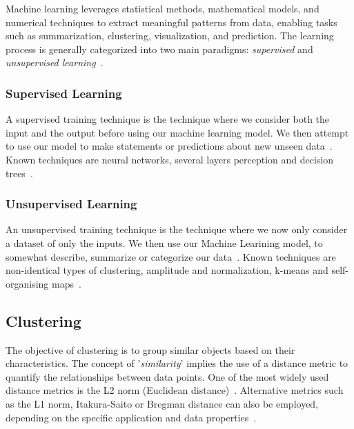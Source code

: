 \documentclass[10pt,twocolumn,letterpaper]{article}
\begin{document}
Machine learning leverages statistical methods, mathematical models, and
numerical techniques to extract meaningful patterns from data, enabling tasks
such as summarization, clustering, visualization, and prediction. The learning
process is generally categorized into two main paradigms: \textit{supervised}
and \textit{unsupervised learning}~\cite{deuschle2019}.


\subsubsection{Supervised Learning}\label{subsubsec:supervised-learning}

A supervised training technique is the technique where we consider both the
input and the output before using our machine learning model. We then attempt
to use our model to make statements or predictions about new unseen
data~\cite{deuschle2019}. Known techniques are neural networks, several layers
perception and decision trees~\cite{kushawahAndYadav2016}.


\subsubsection{Unsupervised Learning}\label{subsubsec:unsupervised-learning}

An unsupervised training technique is the technique where we now only consider
a dataset of only the inputs. We then use our Machine Learining model, to
somewhat describe, summarize or categorize our data~\cite{deuschle2019}. Known
techniques are non-identical types of clustering, amplitude and normalization,
k-means and self-organising maps~\cite{kushawahAndYadav2016}.


\subsection{Clustering}\label{subsec:clustering}

The objective of clustering is to group similar objects based on their
characteristics. The concept of '\textit{similarity}' implies the use of a
distance metric to quantify the relationships between data points. One of the
most widely used distance metrics is the L2 norm (Euclidean
distance)~\cite{deuschle2019}. Alternative metrics such as the L1 norm,
Itakura-Saito or Bregman distance can also be employed, depending on the
specific application and data properties~\cite{Jain2010651}.
\end{document}
